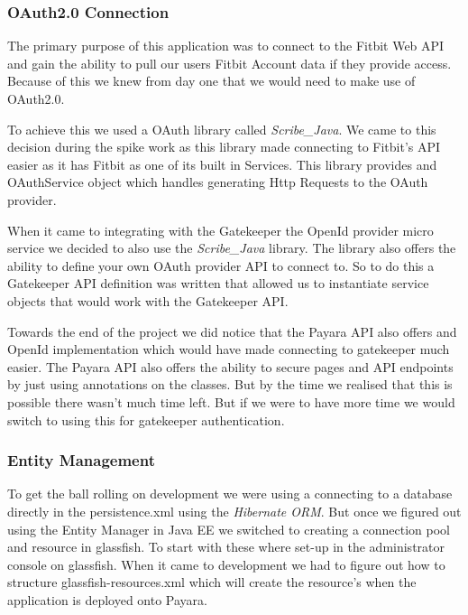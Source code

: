 \subsubsection{OAuth2.0 Connection}

\par
The primary purpose of this application was to connect to the Fitbit Web API and gain the ability to pull our users Fitbit Account data if they provide access. Because of this we knew from day one that we would need to make use of OAuth2.0.
\par
To achieve this we used a OAuth library called \textit{Scribe_Java}\cite{ScribeJava}. We came to this decision during the spike work as this library made connecting to Fitbit's API easier as it has Fitbit as one of its built in Services. This library provides and OAuthService object which handles generating Http Requests to the OAuth provider.
\par
When it came to integrating with the Gatekeeper the OpenId provider micro service we decided to also use the \textit{Scribe_Java}\cite{ScribeJava} library. The library also offers the ability to define your own OAuth provider API to connect to. So to do this a Gatekeeper API definition was written that allowed us to instantiate service objects that would work with the Gatekeeper API.
\par
Towards the end of the project we did notice that the Payara API also offers and OpenId implementation which would have made connecting to gatekeeper much easier. The Payara API also offers the ability to secure pages and API endpoints by just using annotations on the classes. But by the time we realised that this is possible there wasn't much time left. But if we were to have more time we would switch to using this for gatekeeper authentication.

\subsubsection{Entity Management}

\par
To get the ball rolling on development we were using a connecting to a database directly in the persistence.xml using the \textit{Hibernate ORM}\cite{Hibernate}. But once we figured out using the Entity Manager in Java EE we switched to creating a connection pool and resource in glassfish. To start with these where set-up in the administrator console on glassfish. When it came to development we had to figure out how to structure glassfish-resources.xml which will create the resource's when the application is deployed onto Payara.


